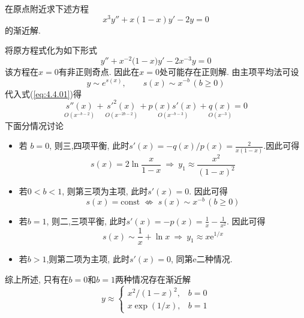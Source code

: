 \begin{problem}[习题4.4]
在原点附近求下述方程
\[
x^3y''+x(1-x)y'-2y=0
\]
的渐近解.
\end{problem}

\begin{solution}
将原方程式化为如下形式
\begin{equation}
y''+x^{-2}\bigg(1-x\bigg)y'-2x^{-3}y=0\label{eq:4.4.01}
\end{equation}
该方程在$x=0$有非正则奇点. 因此在$x=0$处可能存在正则解. 由主项平均法可设
\[
y\sim e^{s(x)},\qquad s(x)\sim x^{-b}\,(b\geq0)
\]
代入式(\ref{eq:4.4.01})得
\[
\underset{O(x^{-b-2})}{s''(x)}+\underset{O(x^{-2b-2})}{s'^{2}(x)}+\underset{O(x^{-b-3})}{p(x)s'(x)}+\underset{O(x^{-3})}{q(x)}=0
\]
下面分情况讨论
\begin{itemize}
\item 若 $b=0$, 则三,四项平衡, 此时$s'(x)=-q(x)/p(x)=\frac{2}{x(1-x)}$.因此可得
\[
s(x)=2\ln\frac{x}{1-x}\:\Longrightarrow\: y_{1}\approx\frac{x^{2}}{(1-x)^{2}}
\]

\item 若$0<b<1$, 则第三项为主项, 此时$s'(x)=0$. 因此可得
\[
s(x)=\mathrm{const}\;\nLeftrightarrow\; s(x)\sim x^{-b}\,(b\geq0)
\]

\item 若$b=1$, 则二,三项平衡, 此时$s'(x)=-p(x)=\frac{1}{x}-\frac{1}{x^{2}}$. 因此可得
\[
s(x)\sim\frac{1}{x}+\ln x\:\Longrightarrow\: y_{1}\approx x\mathrm{e}^{1/x}
\]

\item 若$b>1$,则第二项为主项, 此时$s'(x)=0$, 同第e二种情况.
\end{itemize}
综上所述, 只有在$b=0$和$b=1$两种情况存在渐近解
\[
y\approx\begin{cases}
x^{2}/(1-x)^{2}, & b=0\\
x\exp(1/x), & b=1
\end{cases}
\]
\end{solution} 
